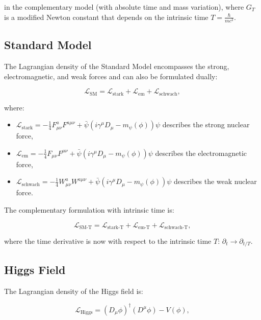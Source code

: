 \documentclass{article}
\begin{document}
	in the complementary model (with absolute time and mass variation), where $G_T$ is a modified Newton constant that depends on the intrinsic time $T = \frac{\hbar}{mc^2}$.
	
	\subsection{Standard Model}
	The Lagrangian density of the Standard Model encompasses the strong, electromagnetic, and weak forces and can also be formulated dually:
	
	\begin{equation}
		\mathcal{L}_\text{SM} = \mathcal{L}_\text{stark} + \mathcal{L}_\text{em} + \mathcal{L}_\text{schwach},
	\end{equation}
	
	where:
	\begin{itemize}
		\item $\mathcal{L}_\text{stark} = -\frac{1}{4} F_{\mu\nu}^a F^{a\mu\nu} + \bar{\psi}(i \gamma^\mu D_\mu - m_\psi(\phi))\psi$ describes the strong nuclear force,
		\item $\mathcal{L}_\text{em} = -\frac{1}{4} F_{\mu\nu} F^{\mu\nu} + \bar{\psi}(i \gamma^\mu D_\mu - m_\psi(\phi))\psi$ describes the electromagnetic force,
		\item $\mathcal{L}_\text{schwach} = -\frac{1}{4} W_{\mu\nu}^a W^{a\mu\nu} + \bar{\psi}(i \gamma^\mu D_\mu - m_\psi(\phi))\psi$ describes the weak nuclear force.
	\end{itemize}
	
	The complementary formulation with intrinsic time is:
	
	\begin{equation}
		\mathcal{L}_\text{SM-T} = \mathcal{L}_\text{stark-T} + \mathcal{L}_\text{em-T} + \mathcal{L}_\text{schwach-T},
	\end{equation}
	
	where the time derivative is now with respect to the intrinsic time $T$: $\partial_t \rightarrow \partial_{t/T}$.
	
	\subsection{Higgs Field}
	The Lagrangian density of the Higgs field is:
	
	\begin{equation}
		\mathcal{L}_\text{Higgs} = (D_\mu \phi)^\dagger (D^\mu \phi) - V(\phi),
	\end{equation}
	
\end{document}
